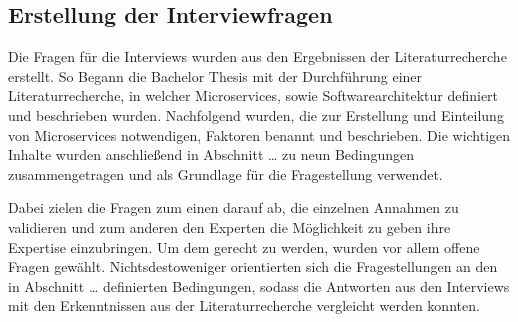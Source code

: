 \subsection{Erstellung der Interviewfragen}

Die Fragen für die Interviews wurden aus den Ergebnissen der Literaturrecherche erstellt. So Begann die Bachelor Thesis mit der Durchführung einer Literaturrecherche, in welcher Microservices, sowie Softwarearchitektur definiert und beschrieben wurden. Nachfolgend wurden, die zur Erstellung und Einteilung von Microservices notwendigen, Faktoren benannt und beschrieben.  Die wichtigen Inhalte wurden anschließend in Abschnitt … zu neun Bedingungen zusammengetragen und als Grundlage für die Fragestellung verwendet.

Dabei zielen die Fragen zum einen darauf ab, die einzelnen Annahmen zu validieren und zum anderen den Experten die Möglichkeit zu geben ihre Expertise einzubringen. Um dem gerecht zu werden, wurden vor allem offene Fragen gewählt. Nichtsdestoweniger orientierten sich die Fragestellungen an den in Abschnitt … definierten Bedingungen, sodass die Antworten aus den Interviews mit den Erkenntnissen aus der Literaturrecherche vergleicht werden konnten.